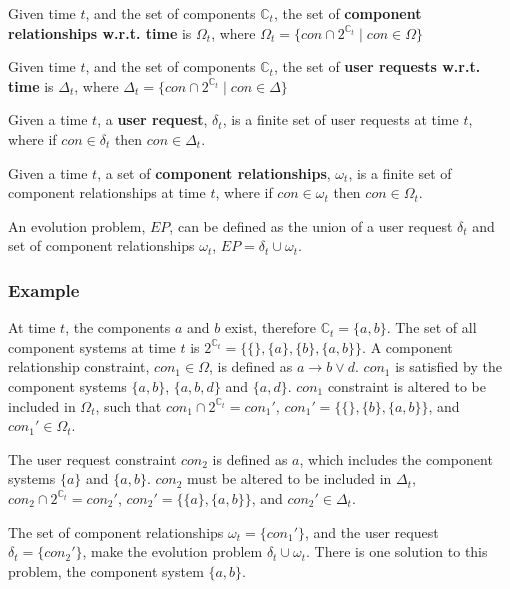 \begin{defs}
Given time $t$, and the set of components $\mathbb{C}_t$, the set of \textbf{component relationships w.r.t. time} is $\Omega_{t}$, where $\Omega_t = \{con \cap 2^{\mathbb{C}_t} \mid con \in \Omega\}$
\end{defs}

\begin{defs}
Given time $t$, and the set of components $\mathbb{C}_t$, the set of \textbf{user requests w.r.t. time} is $\Delta_{t}$, where $\Delta_t = \{con \cap 2^{\mathbb{C}_t} \mid con \in \Delta\}$
\end{defs}

\begin{defs}
Given a time $t$, a \textbf{user request}, $\delta_t$, is a finite set of user requests at time $t$, where if $con \in \delta_t$ then $con \in \Delta_t$.
\end{defs}

\begin{defs}
Given a time $t$, a set of \textbf{component relationships}, $\omega_t$, is a finite set of component relationships at time $t$, where if $con \in \omega_t$ then $con \in \Omega_t$.  
\end{defs}

An evolution problem, $EP$, can be defined as the union of a user request $\delta_t$ and set of component relationships $\omega_t$, $EP = \delta_t \cup \omega_t$.

\subsubsection{Example}
At time $t$, the components $a$ and $b$ exist, therefore $\mathbb{C}_t = \{a,b\}$.
The set of all component systems at time $t$ is $2^{\mathbb{C}_t} = \{\{\},\{a\},\{b\},\{a,b\}\}$.
A component relationship constraint, $con_1 \in \Omega$, is defined as $a \rightarrow b \vee d$.
$con_1$ is satisfied by the component systems $\{a,b\}$, $\{a,b,d\}$ and $\{a,d\}$.
$con_1$  constraint is altered to be included in $\Omega_t$, such that $con_1 \cap 2^{\mathbb{C}_t} = con_1'$, $con_1' = \{\{\},\{b\},\{a,b\}\}$, and $con_1' \in \Omega_t$.

The user request constraint $con_2$ is defined as $a$, which includes the component systems $\{a\}$ and $\{a,b\}$.
$con_2$ must be altered to be included in $\Delta_t$, $con_2 \cap 2^{\mathbb{C}_t} = con_2'$, $con_2' = \{\{a\},\{a,b\}\}$, and $con_2' \in \Delta_t$.

The set of component relationships $\omega_t = \{con_1'\}$, and the user request $\delta_t = \{con_2'\}$, make the evolution problem $\delta_t \cup \omega_t$.
There is one solution to this problem, the component system $\{a,b\}$.  

